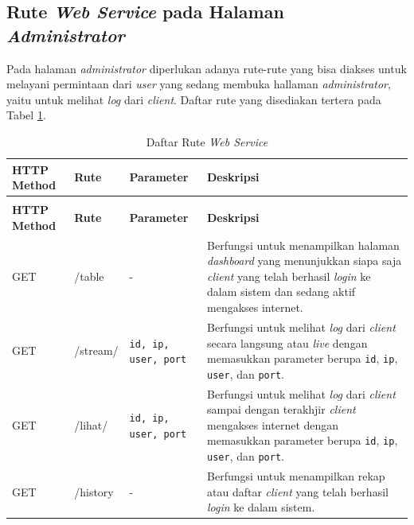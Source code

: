 \subsection{Rute \textit{Web Service} pada Halaman \textit{Administrator}}
Pada halaman \textit{administrator} diperlukan adanya rute-rute yang bisa diakses untuk melayani permintaan dari \textit{user} yang sedang membuka hallaman \textit{administrator}, yaitu untuk melihat \textit{log} dari \textit{client}. Daftar rute yang disediakan tertera pada Tabel \ref{rutehalamanadmin}.\\
\begin{longtable}{|p{}|p{}|p{}|p{}|} %
	
	\caption{Daftar Rute \textit{Web Service} pada Halaman \textit{Administrator}} \label{rutehalamanadmin} \\
	\hline
	\textbf{HTTP Method} & \textbf{Rute} & \textbf{Parameter} & \textbf{Deskripsi} \\ \hline
	
	\endfirsthead
	\caption[]{Daftar Rute \textit{Web Service}}  \\
	\hline
	\textbf{HTTP Method} & \textbf{Rute} & \textbf{Parameter} & \textbf{Deskripsi}  \\ \hline
	
	\endhead
	\endfoot
	\endlastfoot
	
	GET & /table & - & Berfungsi untuk menampilkan halaman \textit{dashboard} yang menunjukkan siapa saja \textit{client} yang telah berhasil \textit{login} ke dalam sistem dan sedang aktif mengakses internet.\\ \hline
	GET & /stream/ & \texttt{id, ip, user, port} & Berfungsi untuk melihat \textit{log} dari \textit{client} secara langsung atau \textit{live} dengan memasukkan parameter berupa \texttt{id}, \texttt{ip}, \texttt{user}, dan \texttt{port}.\\ \hline
	GET & /lihat/ & \texttt{id, ip, user, port} & Berfungsi untuk melihat \textit{log} dari \textit{client} sampai dengan terakhjir \textit{client} mengakses internet dengan memasukkan parameter berupa \texttt{id}, \texttt{ip}, \texttt{user}, dan \texttt{port}.\\ \hline
	GET & /history & - & Berfungsi untuk menampilkan rekap atau daftar \textit{client} yang telah berhasil \textit{login} ke dalam sistem.\\ \hline
\end{longtable}

